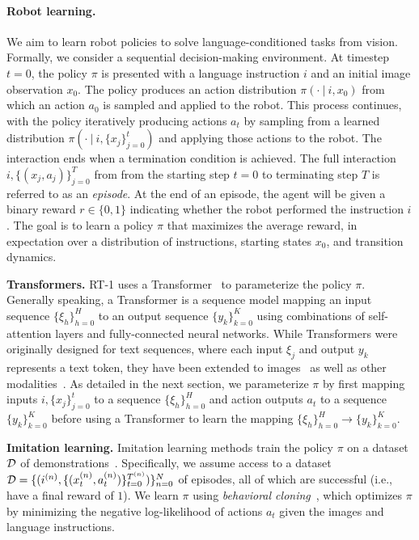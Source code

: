 \documentclass{article} %
\begin{document}
\paragraph{Robot learning.} We aim to learn robot policies to solve language-conditioned tasks from vision. Formally, we consider a sequential decision-making environment. At timestep $t=0$, the policy $\pi$ is presented with a language instruction $i$ and an initial image observation $x_0$. The policy produces an action distribution $\pi(\cdot~|~i,x_0)$ from which an action $a_0$ is sampled and applied to the robot. This process continues, with the policy iteratively producing actions $a_t$ by sampling from a learned distribution $\pi(\cdot~|~i,\{x_j\}_{j=0}^t)$ and applying those actions to the robot. The interaction ends when a termination condition is achieved. %
The full interaction $i,\{(x_j,a_j)\}_{j=0}^T$ from from the starting step $t=0$ to terminating step $T$ is referred to as an \emph{episode}.
At the end of an episode, the agent will be given a binary reward $r\in\{0,1\}$ indicating whether the robot performed the instruction $i$. The goal is to learn a policy $\pi$ that maximizes the average reward, in expectation over a distribution of instructions, starting states $x_0$, and transition dynamics.

\noindent\textbf{Transformers.}\label{sec:prelims_transformers}
RT-1 uses a Transformer~\citep{vaswani2017attention} to parameterize the policy $\pi$. Generally speaking, a Transformer is a sequence model mapping an input sequence $\{\xi_h\}_{h=0}^H$ to an output sequence $\{y_k\}_{k=0}^K$ using combinations of self-attention layers and fully-connected neural networks. While Transformers were originally designed for text sequences, where each input $\xi_j$ and output $y_k$ represents a text token, they have been extended to images~\citep{parmar2018image} as well as other modalities~\citep{lee2022multi,reed2022generalist}.
As detailed in the next section, we parameterize $\pi$ by first mapping inputs $i,\{x_j\}_{j=0}^t$ to a sequence $\{\xi_h\}_{h=0}^H$ and action outputs $a_t$ to a sequence $\{y_k\}_{k=0}^K$ before using a Transformer to learn the mapping $\{\xi_h\}_{h=0}^H\to\{y_k\}_{k=0}^K$.

\noindent\textbf{Imitation learning.}\label{sec:prelims_il}
Imitation learning methods train the policy $\pi$ on a dataset $\mathcal{D}$ of demonstrations~\citep{pomerleau1988alvinn,zhang2018deep,jang2022bc}. Specifically, we assume access to a dataset $\mathcal{D}=\{(i^{(n)}, \{(x_t^{(n)},a_t^{(n)})\}_{t=0}^{T^{(n)}})\}_{n=0}^N$ of episodes, all of which are successful (i.e., have a final reward of $1$). 
We learn $\pi$ using \emph{behavioral cloning}~\citep{pomerleau1988alvinn}, which optimizes $\pi$ by minimizing the negative log-likelihood of actions $a_t$ given the images and language instructions.
\end{document}

